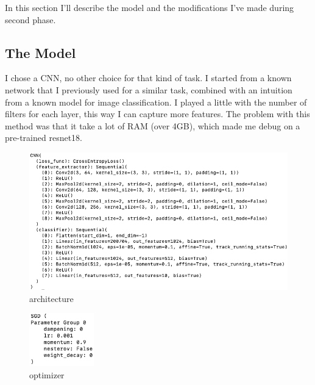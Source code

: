 In this section I'll describe the model and the modifications I've made during second phase.
\subsection{The Model}
I chose a CNN, no other choice for that kind of task.
I started from a known network that I previously used for a similar task, combined with an intuition from a known model
for image classification.
I played a little with the number of filters for each layer, this way I can capture more features.
The problem with this method was that it take a lot of RAM (over 4GB), which made me debug on a pre-trained resnet18.
\begin{figure}[H]
    \centering
     \includegraphics[scale=0.5]{images/architecture}
    \caption{architecture}
    \label{fig:architecture}
\end{figure}

\begin{figure}[H]
    \centering
    \includegraphics[width=0.25\textwidth]{images/optimizer}
    \caption{optimizer}
    \label{fig:optimizer}
\end{figure}

